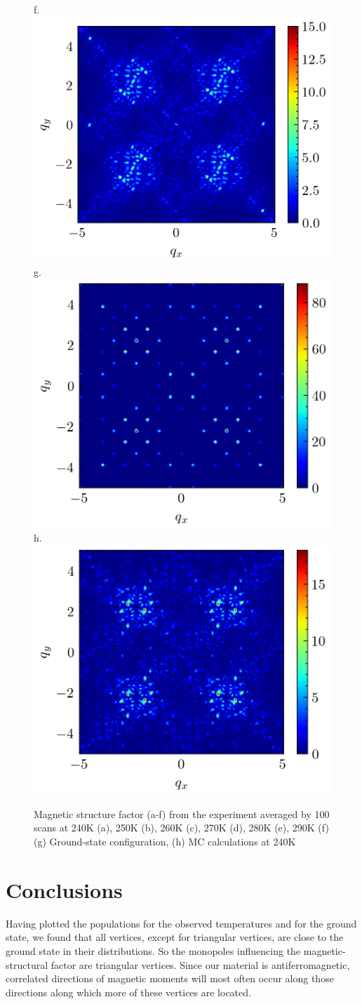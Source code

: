 \documentclass[pre,reprint,superscriptaddress]{revtex4-2}
\begin{document}
\begin{figure}[t]
	f.\includegraphics[width=0.45\linewidth]{figs/msf_experiment_290K.png} \\  
	g.\includegraphics[width=0.45\linewidth]{figs/msf_mc_gs.png} 
	h.\includegraphics[width=0.45\linewidth]{figs/msf_mc_240K.png} 
	\caption{\label{MSF} Magnetic structure factor 
		(a-f) from the experiment averaged by 100 scans at 240K (a), 250K (b), 260K (c), 
		270K (d), 280K (e), 290K (f)
		(g) Ground-state configuration, (h) MC calculations at 240K}
\end{figure}

\section{Conclusions}
Having plotted the populations for the observed temperatures and for the ground state, we found that all vertices, except for triangular vertices, are close to the ground state in their distributions. So the monopoles influencing the magnetic-structural factor are triangular vertices. Since our material is antiferromagnetic, correlated directions of magnetic moments will most often occur along those directions along which more of these vertices are located. 
\end{document}
